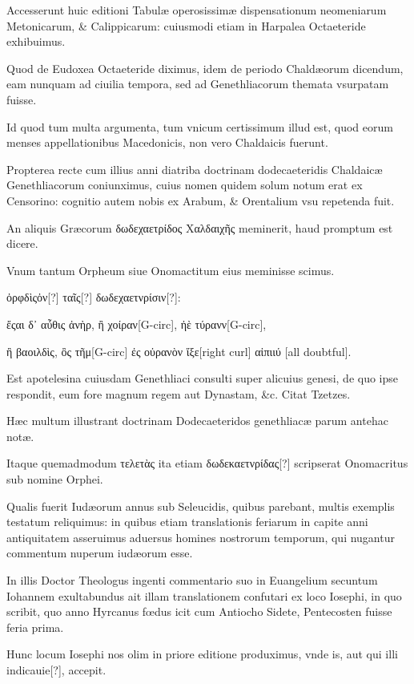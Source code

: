 \begin{parnumbers}
Accesserunt huic editioni Tabulæ operosissimæ dispensationum neomeniarum Metonicarum, \& Calippicarum: cuiusmodi etiam in Harpalea Octaeteride exhibuimus. 

Quod de Eudoxea Octaeteride diximus, idem de periodo Chaldæorum dicendum, eam nunquam ad ciuilia tempora, sed ad Genethliacorum themata vsurpatam fuisse.

Id quod tum multa argumenta, tum vnicum certissimum illud est, quod eorum menses appellationibus Macedonicis, non vero Chaldaicis fuerunt.

Propterea recte cum illius anni diatriba doctrinam dodecaeteridis Chaldaicæ Genethliacorum coniunximus, cuius nomen quidem solum notum erat ex Censorino: cognitio autem nobis ex Arabum, \& Orentalium vsu repetenda fuit.

An aliquis Græcorum \textgreek{δωδεχαετρίδος Χαλδαιχῆς} meminerit, haud promptum est dicere.

Vnum tantum Orpheum siue Onomactitum eius meminisse scimus. 

\textgreek{ὀρφδὶςὀν[?] ταῖς[?] δωδεχαετνρίσιν[?]:}

\begin{greek}
ἔςαι δ᾽ αὖθις ἀνὴρ, ἢ χοίραν[G-circ], ἠὲ τύρανν[G-circ],

ἢ βαοιλδὶς, ὂς τῆμ[G-circ] ἐς οὐρανὸν ἴξε[right curl] αἰπιιύ [all doubtful].
\end{greek}

Est apotelesina cuiusdam Genethliaci consulti super alicuius genesi, de quo ipse respondit, eum fore magnum regem aut Dynastam, \&c. Citat Tzetzes. 

Hæc multum illustrant doctrinam Dodecaeteridos genethliacæ parum antehac notæ.

Itaque quemadmodum \textgreek{τελετὰς} ita etiam \textgreek{δωδεκαετνρίδας[?]} scripserat Onomacritus sub nomine Orphei.

Qualis fuerit Iudæorum annus sub Seleucidis, quibus parebant, multis exemplis testatum reliquimus: in quibus etiam translationis feriarum in capite anni antiquitatem asseruimus aduersus homines nostrorum temporum, qui nugantur commentum nuperum iudæorum esse.

In illis Doctor Theologus ingenti commentario suo in Euangelium secuntum Iohannem exultabundus ait illam translationem confutari ex loco Iosephi, in quo scribit, quo anno Hyrcanus fœdus icit cum Antiocho Sidete, Pentecosten fuisse feria prima.

Hunc locum Iosephi nos olim in priore editione produximus, vnde is, aut qui illi indicauie[?], accepit.


\end{parnumbers}
